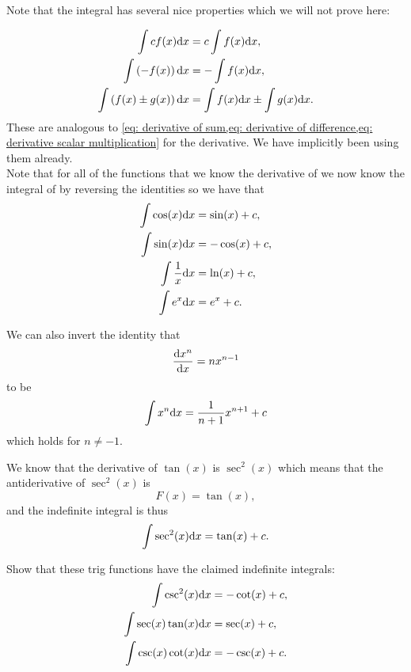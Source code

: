 Note that the integral has several nice properties which we will not prove here:

\begin{align}
\int c f(x) \mathrm{d} x &= c\int f(x) \mathrm{d} x, \label{eq: integral scalar multiplication}\\
\int \left(-f(x)\right)\mathrm{d} x&=-\int f(x)\mathrm{d} x, \\
\int \left(f(x)\pm g(x)\right)\mathrm{d} x &=\int f(x)\mathrm{d} x \pm \int g(x)\mathrm{d} x. \label{eq: derivative of sum}
\end{align}
These are analogous to \cref{eq: derivative of sum,eq: derivative of difference,eq: derivative scalar multiplication} for the derivative. We have implicitly been using them already.\\

Note that for all of the functions that we know the derivative of we now know the integral of by reversing the identities so we have that
\begin{align*}
\int\cos(x)\mathrm{d} x &=\sin(x) +c,\\
\int \sin(x) \mathrm{d} x &=-\cos(x)+c,\\
\int \frac{1}{x}\mathrm{d} x &=\ln(x) +c,\\
\int e^{x}\mathrm{d} x &=e^{x}+c.
\end{align*}

We can also invert the identity that 
\begin{equation*}
\frac{\mathrm{d} x^{n}}{\mathrm{d} x}=nx^{n-1}
\end{equation*}
to be
\begin{equation}
\int x^{n}\mathrm{d} x =\frac{1}{n+1}x^{n+1} +c
\label{eq: integral of monomial}
\end{equation}
which holds for $n\neq -1$.
\begin{ex}
We know that the derivative of $\tan(x)$ is $\sec^{2}(x)$ which means that the antiderivative of $\sec^{2}(x)$ is
\begin{equation*}
F(x)=\tan(x),
\end{equation*}
and the indefinite integral is thus
\begin{equation*}
\int \sec^{2}(x)\mathrm{d} x = \tan(x)+c.
\end{equation*}
\end{ex}

\begin{exercise}
Show that these trig functions have the claimed indefinite integrals:
\begin{align*}
\int \csc^{2}(x)\mathrm{d} x &=-\cot(x) +c,\\
\int \sec(x)\tan(x)\mathrm{d} x &=\sec(x) +c,\\
\int \csc(x)\cot(x)\mathrm{d} x &=-\csc(x) +c.
\end{align*}
\end{exercise}

